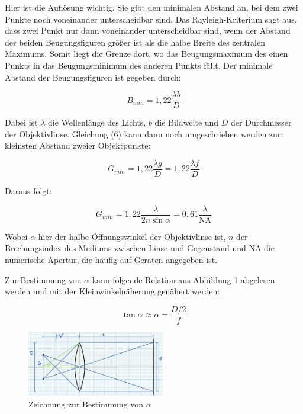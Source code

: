 \documentclass{article}
\begin{document}
Hier ist die Auflösung wichtig. Sie gibt den minimalen Abstand an, bei dem zwei Punkte noch voneinander unterscheidbar sind. Das Rayleigh-Kriterium sagt aus, dass zwei Punkt nur dann voneinander unterscheidbar sind, wenn der Abstand der beiden Beugungsfiguren größer ist als die halbe Breite des zentralen Maximums. Somit liegt die Grenze dort, wo das Beugungsmaximum des einen Punkts in das Beugungsminimum des anderen Punkts fällt. Der minimale Abstand der Beugungsfiguren ist gegeben durch:

\begin{equation}
    B_{min} = 1,22 \frac{\lambda b}{D}
\end{equation}

Dabei ist $\lambda$ die Wellenlänge des Lichts, $b$ die Bildweite und $D$ der Durchmesser der Objektivlinse. Gleichung (6) kann dann noch umgeschrieben werden zum kleinsten Abstand zweier Objektpunkte:

\begin{equation}
    G_{min} = 1,22 \frac{\lambda g}{D} = 1,22 \frac{\lambda f}{D}
\end{equation}

Daraus folgt:

\begin{equation}
    G_{min} = 1,22 \frac{\lambda}{2n \sin{\alpha}} = 0,61 \frac{\lambda}{\text{NA}}
\end{equation}

Wobei $\alpha$ hier der halbe Öffnungswinkel der Objektivlinse ist, $n$ der Brechungsindex des Mediums zwischen Linse und Gegenstand und NA die numerische Apertur, die häufig auf Geräten angegeben ist.

Zur Bestimmung von $\alpha$ kann folgende Relation aus Abbildung 1 abgelesen werden und mit der Kleinwinkelnäherung genähert werden:

\begin{equation}
    \tan{\alpha} \approx \alpha = \frac{D/2}{f}
\end{equation}

\begin{figure} [h]
    \centering
    \includegraphics[width=6cm]{graphics/dia0.jpg}
    \caption{Zeichnung zur Bestimmung von $\alpha$}
\end{figure}
\end{document}
